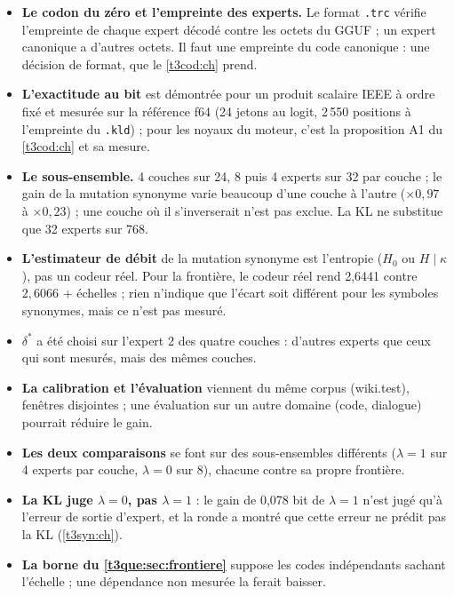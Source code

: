 \begin{faux}
\begin{itemize}
\item \textbf{Le codon du zéro et l'empreinte des experts.} Le format \texttt{.trc} vérifie l'empreinte de chaque expert décodé contre les octets du GGUF ; un expert canonique a d'autres octets. Il faut une empreinte du code canonique : une décision de format, que le \cref{t3cod:ch} prend.
\item \textbf{L'exactitude au bit} est démontrée pour un produit scalaire IEEE à ordre fixé et mesurée sur la référence f64 (24 jetons au logit, 2\,550 positions à l'empreinte du \texttt{.kld}) ; pour les noyaux du moteur, c'est la proposition A1 du \cref{t3cod:ch} et sa mesure.
\item \textbf{Le sous-ensemble.} 4 couches sur 24, 8 puis 4 experts sur 32 par couche ; le gain de la mutation synonyme varie beaucoup d'une couche à l'autre ($\times 0{,}97$ à $\times 0{,}23$) ; une couche où il s'inverserait n'est pas exclue. La KL ne substitue que 32 experts sur 768.
\item \textbf{L'estimateur de débit} de la mutation synonyme est l'entropie ($H_0$ ou $H\mid\kappa$), pas un codeur réel. Pour la frontière, le codeur réel rend 2,6441 contre $2{,}6066$ + échelles ; rien n'indique que l'écart soit différent pour les symboles synonymes, mais ce n'est pas mesuré.
\item \textbf{$\delta^\ast$} a été choisi sur l'expert 2 des quatre couches : d'autres experts que ceux qui sont mesurés, mais des mêmes couches.
\item \textbf{La calibration et l'évaluation} viennent du même corpus (wiki.test), fenêtres disjointes ; une évaluation sur un autre domaine (code, dialogue) pourrait réduire le gain.
\item \textbf{Les deux comparaisons} se font sur des sous-ensembles différents ($\lambda = 1$ sur 4 experts par couche, $\lambda = 0$ sur 8), chacune contre sa propre frontière.
\item \textbf{La KL juge $\lambda = 0$, pas $\lambda = 1$} : le gain de 0,078 bit de $\lambda = 1$ n'est jugé qu'à l'erreur de sortie d'expert, et la ronde a montré que cette erreur ne prédit pas la KL (\cref{t3syn:ch}).
\item \textbf{La borne du \cref{t3que:sec:frontiere}} suppose les codes indépendants sachant l'échelle ; une dépendance non mesurée la ferait baisser.
\end{itemize}
\end{faux}
